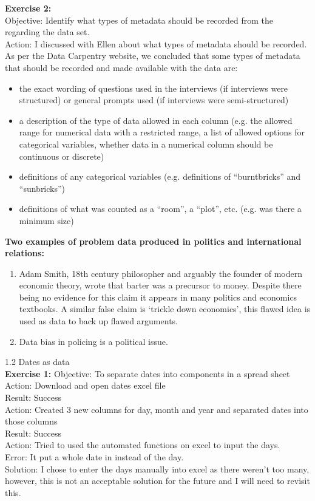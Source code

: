 \documentclass{article}
\newcommand{\chapsubhead}[1]{{\Large #1 \vspace{2ex}}}
\begin{document}
\textbf{Exercise 2:}\\
Objective: Identify what types of metadata should be recorded from the regarding the data set.\\
Action: I discussed with Ellen about what types of metadata should be recorded. As per the Data Carpentry website, we concluded that some types of metadata that should be recorded and made available with the data are:
\begin{itemize}
\item the exact wording of questions used in the interviews (if interviews were structured) or general prompts used (if interviews were semi-structured)
\item a description of the type of data allowed in each column (e.g. the allowed range for numerical data with a restricted range, a list of allowed options for categorical variables, whether data in a numerical column should be continuous or discrete)
\item definitions of any categorical variables (e.g. definitions of “burntbricks” and “sunbricks”) 
\item definitions of what was counted as a “room”, a “plot”, etc. (e.g. was there a minimum size)
\end{itemize}

\textbf{Two examples of problem data produced in politics and international relations:}
\begin{enumerate}
\item Adam Smith, 18th century philosopher and arguably the founder of modern economic theory, wrote that barter was a precursor to money. Despite there being no evidence for this claim it appears in many politics and economics textbooks. A similar false claim is ‘trickle down economics’, this flawed idea is used as data to back up flawed arguments.
\item 	Data bias in policing is a political issue. \newline
\end{enumerate}

\chapsubhead{1.2 Dates as data}\\
\textbf{Exercise 1:}\newline 
Objective: To separate dates into components in a spread sheet\\
Action:	Download and open dates excel file\\
Result: Success\\
Action: Created 3 new columns for day, month and year and separated dates into those columns\\ 
Result: Success\\
Action: Tried to used the automated functions on excel to input the days.\\
Error: It put a whole date in instead of the day.\\
Solution: I chose to enter the days manually into excel as there weren’t too many, however, this is not an acceptable solution for the future and I will need to revisit this.\\
\end{document}
